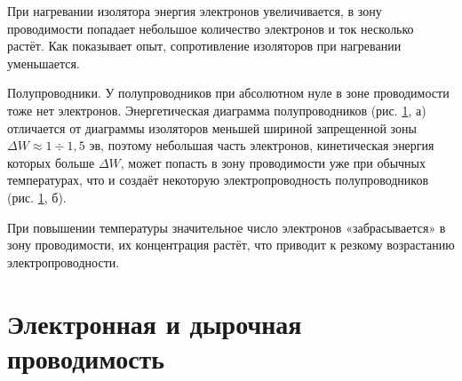 \documentclass[a4paper,10pt]{book}
\begin{document}
При нагревании изолятора энергия электронов увеличивается, в зону проводимости попадает небольшое количество электронов и ток несколько растёт. Как показывает опыт, сопротивление изоляторов при нагревании уменьшается.

\begin{figure}[h]
	\caption{}
	\label{pic56}
\end{figure}

$\textbf{Полупроводники.}$ У полупроводников при абсолютном нуле в зоне проводимости тоже нет электронов. Энергетическая диаграмма полупроводников (рис. \ref{pic56}, $\textit{а}$) отличается от диаграммы изоляторов меньшей шириной запрещенной зоны $\Delta W \approx 1 \div 1,5\textit{ эв}$, поэтому небольшая часть электронов, кинетическая энергия которых больше $\Delta W$, может попасть в зону проводимости уже при обычных температурах, что и создаёт некоторую электропроводность полупроводников (рис. \ref{pic56}, $\textit{б}$).

При повышении температуры значительное число электронов «забрасывается» в зону проводимости, их концентрация растёт, что приводит к резкому возрастанию электропроводности.

\section{Электронная и дырочная проводимость}
\end{document}
